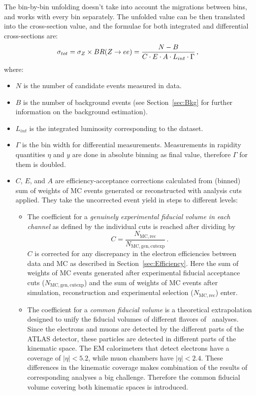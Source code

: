The bin-by-bin unfolding doesn't take into account the migrations between bins, and works with every bin separately. The unfolded value can be then translated into the cross-section value, and the formulae for both integrated and differential cross-sections are:
\begin{equation}
\sigma_{tot} = \sigma_{Z} \times BR(Z \rightarrow ee) = \frac{N - B}{C \cdot E \cdot A \cdot L_{int}  \cdot \Gamma}\,,
\end{equation}
where:
\begin{itemize}
\item {\bfseries $N$} is the number of candidate events measured in data.
\item {\bfseries $B$} is the number of background events (see Section~\ref{sec:Bkg} for further information on the background estimation).
\item {\bfseries $L_{int}$} is the integrated luminosity corresponding to the dataset.
\item {\bfseries $\Gamma$} is the bin width for differential measurements. Measurements in rapidity quantities $\eta$ and $y$ are done in absolute binning as final value, therefore $\Gamma$ for them is doubled.
\item $C$, $E$, and $A$ are efficiency-acceptance corrections calculated from (binned) sum of weights of MC events generated or reconstructed with analysis cuts applied. They take the uncorrected event yield in steps to different levels:
\begin{itemize}
\item The coefficient for a \textit{genuinely experimental fiducial volume in each channel} as defined by the individual cuts is reached after dividing by
\begin{equation}
  C = \frac{N_\mathrm{MC, rec}}{N_\mathrm{MC, gen, cutexp}}\,.
\end{equation}
$C$ is corrected for any discrepancy in the electron efficiencies between data and MC as described in Section~\ref{sec:Efficiency}. Here the sum of weights of MC events generated after experimental fiducial acceptance cuts ($N_\mathrm{MC, gen, cutexp}$) and the sum of weights of MC events after simulation, reconstruction and experimental selection ($N_\mathrm{MC, rec}$) enter.
\item The coefficient for a \textit{common fiducial volume} is a theoretical extrapolation designed to unify the fiducial volumes of different flavors of \Zll\ analyses. Since the electrons and muons are detected by the different parts of the ATLAS detector, these particles are detected in different parts of the kinematic space. The EM calorimeters that detect electrons have a coverage of $|\eta| < 5.2$, while muon chambers have $|\eta| < 2.4$. These differences in the kinematic coverage makes combination of the results of corresponding analyses a big challenge. Therefore the common fiducial volume covering both kinematic spaces is introduced.

\end{itemize}
\end{itemize}
